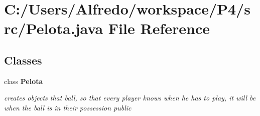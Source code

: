 \section{C\+:/\+Users/\+Alfredo/workspace/\+P4/src/\+Pelota.java File Reference}
\label{_pelota_8java}
\subsection*{Classes}
\begin{DoxyCompactItemize}
\item 
class {\bf Pelota}
\begin{DoxyCompactList}\small\item\em creates objects that ball, so that every player knows when he has to play, it will be when the ball is in their possession  public \end{DoxyCompactList}\end{DoxyCompactItemize}
